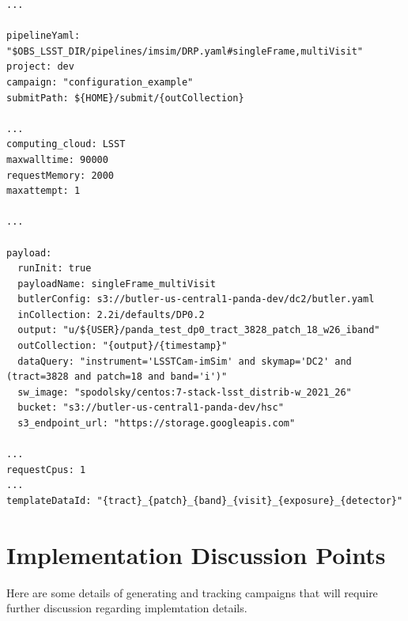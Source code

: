 \documentclass[DM,authoryear,toc]{lsstdoc}
\begin{document}
\begin{verbatim}
...

pipelineYaml: "$OBS_LSST_DIR/pipelines/imsim/DRP.yaml#singleFrame,multiVisit"
project: dev
campaign: "configuration_example"
submitPath: ${HOME}/submit/{outCollection}

...
computing_cloud: LSST
maxwalltime: 90000
requestMemory: 2000
maxattempt: 1

...

payload:
  runInit: true
  payloadName: singleFrame_multiVisit
  butlerConfig: s3://butler-us-central1-panda-dev/dc2/butler.yaml
  inCollection: 2.2i/defaults/DP0.2
  output: "u/${USER}/panda_test_dp0_tract_3828_patch_18_w26_iband"
  outCollection: "{output}/{timestamp}"
  dataQuery: "instrument='LSSTCam-imSim' and skymap='DC2' and (tract=3828 and patch=18 and band='i')"
  sw_image: "spodolsky/centos:7-stack-lsst_distrib-w_2021_26"
  bucket: "s3://butler-us-central1-panda-dev/hsc"
  s3_endpoint_url: "https://storage.googleapis.com"

...
requestCpus: 1
...
templateDataId: "{tract}_{patch}_{band}_{visit}_{exposure}_{detector}"

\end{verbatim}

\section{Implementation Discussion Points}

Here are some details of generating and tracking campaigns that will
require further discussion regarding implemtation details.
\end{document}
